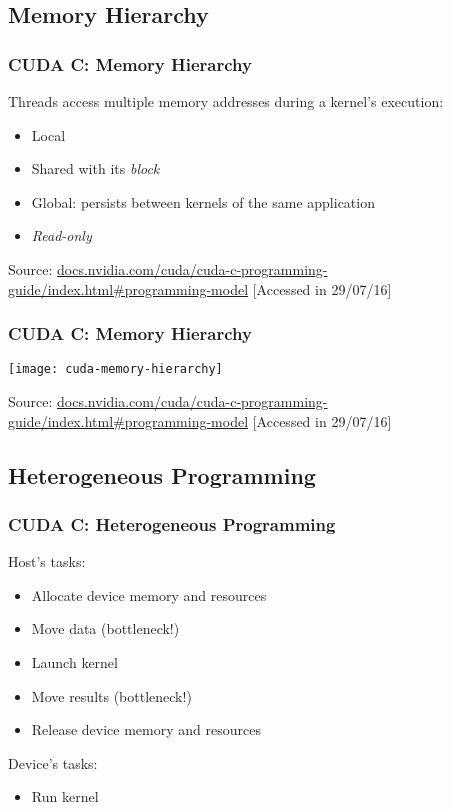 \documentclass[10pt, compress]{beamer}
\begin{document}
\subsection{Memory Hierarchy}

\begin{frame}
    \frametitle{CUDA C: Memory Hierarchy}
    Threads access \alert{multiple memory addresses} during a kernel's execution:
    \begin{itemize}
        \item Local
            \pause
        \item Shared with its \textit{block}
            \pause
        \item Global\pause: persists between kernels of the \alert{same application}
            \pause
        \item \textit{Read-only}
    \end{itemize}
    \vfill

    \begin{center}
        \tiny{Source: \url{docs.nvidia.com/cuda/cuda-c-programming-guide/index.html\#programming-model} [Accessed in 29/07/16]}
    \end{center}
\end{frame}

\begin{frame}
    \frametitle{CUDA C: Memory Hierarchy}
    \begin{center}
        \texttt{[image: cuda-memory-hierarchy]}
    \end{center}

    \vfill

    \begin{center}
        \tiny{Source: \url{docs.nvidia.com/cuda/cuda-c-programming-guide/index.html\#programming-model} [Accessed in 29/07/16]}
    \end{center}
\end{frame}

\subsection{Heterogeneous Programming}

\begin{frame}
    \frametitle{CUDA C: Heterogeneous Programming}
    \alert{Host}'s tasks:
    \begin{itemize}
        \item Allocate \alert{device} memory and resources
        \item Move \alert{data} (\alert{bottleneck!})
            \pause
        \item Launch kernel
            \pause
        \item Move \alert{results} (\alert{bottleneck!})
        \item Release \alert{device} memory and resources
    \end{itemize}
    \pause
    \alert{Device}'s tasks:
    \begin{itemize}
        \item Run kernel
    \end{itemize}
\end{frame}
\end{document}
